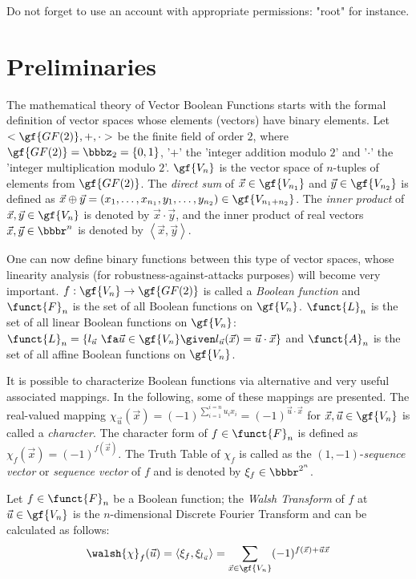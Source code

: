 Do not forget to use an account with appropriate permissions: "root" for instance.

\section{Preliminaries}

The mathematical theory of Vector Boolean Functions starts with the formal
definition of vector spaces whose elements (vectors) have binary elements.
Let $< \gf{GF(2)}, +, \cdot >$ be the finite field of order $2$, where
$\gf{GF(2)} = \bbbz_2 = \{0,1\}$, '$+$' the 'integer addition modulo $2$' and
'$\cdot$' the 'integer multiplication modulo $2$'. $\gf{V_n}$ is the vector
space of $n$-tuples of elements from $\gf{GF(2)}$. The \textsl{direct sum} of
$\vec{x} \in \gf{V_{n_1}}$ and $\vec{y} \in \gf{V_{n_2}}$ is defined as
$\vec{x} \oplus \vec{y}  = (x_1, \ldots, x_{n_1}, y_1, \ldots, y_{n_2}) \in
\gf{V_{n_1+n_2}}$. The \textsl{inner product} of $\vec{x},\vec{y} \in
\gf{V_n}$ is denoted by $\vec{x} \cdot \vec{y}$, and the inner product of real
vectors $\vec{x}, \vec{y} \in \bbbr^n$ is denoted by
$\left\langle\vec{x},\vec{y}\right\rangle$. 

One can now define binary functions 
  between this type of vector spaces, whose 
linearity analysis (for robustness-against-attacks purposes) will become very
important.
$f: \gf{V_n} \to \gf{GF(2)}$ is called a \textsl{Boolean function} and
$\funct{F}_n$ is the set of all Boolean functions on $\gf{V_n}$. $\funct{L}_n$
is the set of all linear Boolean functions on $\gf{V_n}$: $\funct{L}_n =
\{l_{\vec{u}} \  \fa \vec{u} \in \gf{V_n} \given l_{\vec{u}}(\vec{x})=\vec{u}
\cdot \vec{x}\}$ and $\funct{A}_n$ is the set of all affine Boolean functions
on $\gf{V_n}$. 

It is possible to characterize Boolean functions via alternative and very
useful associated mappings. In the following, some of these mappings are
presented. 
The real-valued mapping $\chi_{\vec{u}}(\vec{x})={(-1)}^{\sum_{i=1}^{i=n} u_i
  x_i}={(-1)}^{\vec{u} \cdot \vec{x}}$ for $\vec{x}, \vec{u} \in \gf{V_n}$ is
called a \textsl{character}. The character form of $f \in \funct{F}_n$ is
defined as $\chi_f(\vec{x})=(-1)^{f(\vec{x})}$. The Truth Table of $\chi_f$ is
called as the $(1,-1)$-\textsl{sequence vector} or \textsl{sequence vector} of
$f$ and is denoted by $\xi_f \in \bbbr^{2^n}$. 

Let $f \in \funct{F}_n$ be a Boolean function; the \textsl{Walsh Transform} of
$f$ at $\vec{u} \in \gf{V_n}$ is the $n$-dimensional Discrete Fourier
Transform and can be calculated as follows: 
\begin{equation}\label{WalshTransformInner}
\walsh{\chi}_f(\vec{u}) = \left\langle \xi_f, \xi_{l_{\vec{u}}} \right\rangle = 
\sum_{\vec{x} \in \gf{V_n}} (-1)^{f(\vec{x}) + \vec{u} \vec{x}} 
\end{equation}

